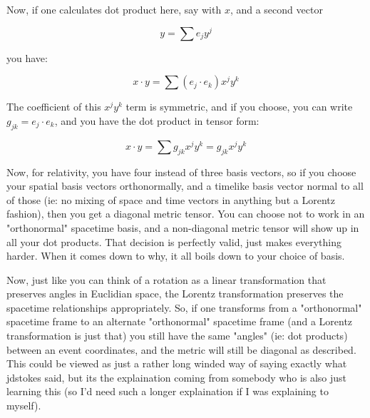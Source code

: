 \documentclass{article}      %
\begin{document}
Now, if one calculates dot product here, say with $x$, and a second vector

\begin{equation*}
y = \sum e_j y^j
\end{equation*}

you have:

\begin{equation*}
x \cdot y = \sum (e_j \cdot e_k) x^j y^k
\end{equation*}

The coefficient of this $x^j y^k$ term is symmetric, and if you choose, you
can write $g_{jk} = e_j \cdot e_k$, and you have the dot product in 
tensor form:

\begin{equation*}
x \cdot y = \sum g_{jk} x^j y^k = g_{jk} x^j y^k
\end{equation*}

Now, for relativity, you have four instead of three basis vectors, so if you choose your spatial basis vectors orthonormally, and a timelike basis vector normal to all of those (ie: no mixing of space and time vectors in anything but a Lorentz fashion), then you get a diagonal metric tensor.  You can choose not to work in an "orthonormal" spacetime basis, and a non-diagonal metric tensor will show up in all your dot products.  That decision is perfectly valid, just makes everything harder.  When it comes down to why, it all boils down to your choice of basis.

Now, just like you can think of a rotation as a linear transformation that preserves angles in Euclidian space, the Lorentz transformation preserves the spacetime relationships appropriately.  So, if one transforms from a "orthonormal" spacetime frame to an alternate "orthonormal" spacetime frame (and a Lorentz transformation is just that) you still have the same "angles" (ie: dot products) between an event coordinates, and the metric will still be diagonal as described.  This could be viewed as just a rather long winded way of saying exactly what jdstokes said, but its the explaination coming from somebody who is also just learning this (so I'd need such a longer explaination if I was explaining to myself).
\end{document}
